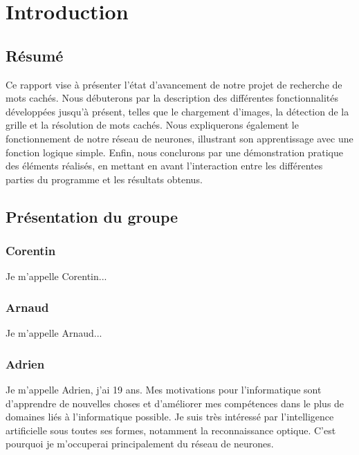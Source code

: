 \section{Introduction}

\subsection{Résumé}

\indent Ce rapport vise à présenter l’état d’avancement de notre projet de recherche de mots cachés. Nous débuterons par la description des différentes fonctionnalités développées jusqu'à présent, telles que le chargement d’images, la détection de la grille et la résolution de mots cachés. Nous expliquerons également le fonctionnement de notre réseau de neurones, illustrant son apprentissage avec une fonction logique simple. Enfin, nous conclurons par une démonstration pratique des éléments réalisés, en mettant en avant l’interaction entre les différentes parties du programme et les résultats obtenus.

\indent \newline\newline

\subsection{Présentation du groupe} \subsubsection{Corentin} \indent Je m'appelle Corentin... \newline\newline

\subsubsection{Arnaud} \indent Je m'appelle Arnaud... \newline\newline

\subsubsection{Adrien} \indent Je m'appelle Adrien, j'ai 19 ans. Mes motivations pour l'informatique sont d'apprendre de nouvelles choses et d'améliorer mes compétences dans le plus de domaines liés à l'informatique possible. Je suis très intéressé par l'intelligence artificielle sous toutes ses formes, notamment la reconnaissance optique. C'est pourquoi je m'occuperai principalement du réseau de neurones. \newline\newline

